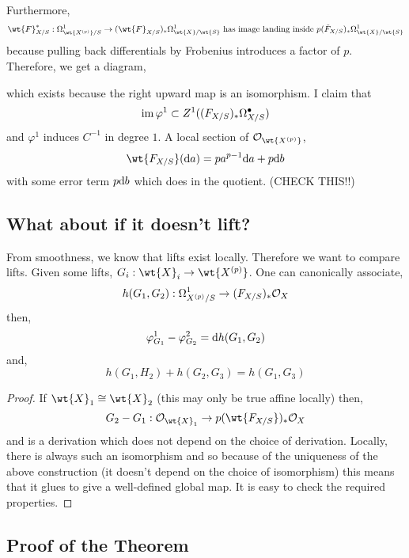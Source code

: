 \documentclass[12pt]{article}
\begin{document}
\noindent 
Furthermore,
\[ \wt{F}_{X/S}^* : \Omega^1_{\wt{X^{(p)}}/S} \to (\wt{F}_{X/S})_* \Omega^1_{\wt{X}/\wt{S}} \text{ has image landing inside } p (\tilde{F}_{X/S})_* \Omega^1_{\wt{X}/\wt{S}} \]
because pulling back differentials by Frobenius introduces a factor of $p$. Therefore, we get a diagram,
\begin{center}
\end{center}
which exists because the right upward map is an isomorphism. I claim that
\[ \operatorname{\mathrm{im}}{\varphi^1} \subset Z^1((F_{X/S})_* \Omega^\bullet_{X/S}) \]
and $\varphi^1$ induces $C^{-1}$ in degree $1$. A local section of $\struct{\wt{X^{(p)}}}$,
\[ \wt{F_{X/S}}(\d{a}) = p a^{p-1} \d{a} + p \d{b} \]
with some error term $p \mathrm{d}{b}$ which does in the quotient. (CHECK THIS!!)

\subsection{What about if it doesn't lift?}

From smoothness, we know that lifts exist locally. Therefore we want to compare lifts. Given some lifts, $G_i : \wt{X}_i \to \wt{X^{(p)}}$. One can canonically associate,
\[ h(G_1, G_2) : \Omega^1_{X^{(p)}/S} \to (F_{X/S})_* \mathcal{O}_{X} \]
then,
\[ \varphi^1_{G_1} - \varphi^2_{G_2} = \mathrm{d}{h(G_1, G_2)} \] 
and,
\[ h(G_1, H_2) + h(G_2, G_3) = h(G_1, G_3) \]

\begin{proof}
If $\wt{X}_1 \cong \wt{X}_2$ (this may only be true affine locally) then,
\[ G_2 - G_1 : \struct{\wt{X}_1} \to p (\wt{F_{X/S}})_* \struct{X} \]
and is a derivation which does not depend on the choice of derivation. Locally, there is always such an isomorphism and so because of the uniqueness of the above construction (it doesn't depend on the choice of isomorphism) this means that it glues to give a well-defined global map. It is easy to check the required properties.
\end{proof}

\subsection{Proof of the Theorem}
\end{document}
